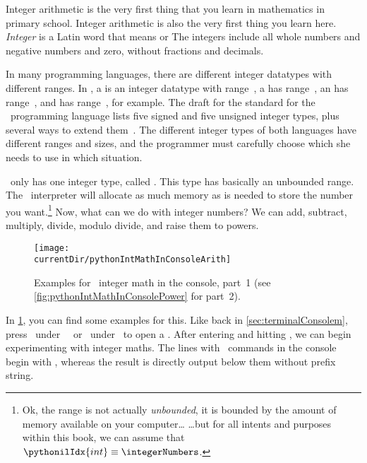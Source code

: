 %
\label{sec:int}%
%
Integer arithmetic is the very first thing that you learn in mathematics in primary school.
Integer arithmetic is also the very first thing you learn here.
\emph{Integer} is a Latin word that means  or 
The integers include all whole numbers and negative numbers and zero, without fractions and decimals.

In many programming languages, there are different integer datatypes with different ranges.
In , a  is an integer datatype with range~, a  has range~, an  has range~, and  has range~, for example.
The draft for the  standard for the ~programming language lists five signed and five unsigned integer types, plus several ways to extend them~\cite{ISOIEC207PLCWDOS}.
The different integer types of both languages have different ranges and sizes, and the programmer must carefully choose which she needs to use in which situation.

\python\ only has one integer type, called .
This type has basically an unbounded range.
The \python\ interpreter will allocate as much memory as is needed to store the number you want.\footnote{%
Ok, the range is not actually \emph{unbounded}, it is bounded by the amount of memory available on your computer{\dots} {\dots}but for all intents and purposes within this book, we can assume that~$\pythonilIdx{int}\equiv\integerNumbers$.}%
%
%
Now, what can we do with integer numbers?
We can add, subtract, multiply, divide, modulo divide, and raise them to powers.

\begin{figure}%
\centering%
\texttt{[image: \\currentDir/pythonIntMathInConsoleArith]}%
\caption{Examples for \python\ integer math in the console, part~1 (see \cref{fig:pythonIntMathInConsolePower} for part~2).}%
\label{fig:pythonIntMathInConsoleArith}%
\end{figure}%

In \cref{fig:pythonIntMathInConsoleArith}, you can find some examples for this.
Like back in \cref{sec:terminalConsolem}, press \ubuntuTerminal\ under \ubuntu\ \linux\ or \windowsTerminal\ under \windows\ to open a .
After entering  and hitting \keys{\enter}, we can begin experimenting with integer maths.
The lines with \python\ commands in the console begin with \pythonil{>>>}, whereas the result is directly output below them without prefix string.

